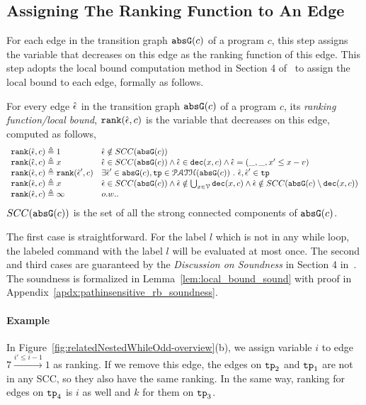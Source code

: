   \subsection{Assigning The Ranking Function to An Edge}
  For each edge in the transition graph $\mathtt{abs}{\mathtt{G}}(c)$ of a program $c$,
  this step assigns the variable that decreases on this edge as the ranking function of this edge.
  This step adopts the local bound computation method in Section 4 of~\cite{SinnZV17} to assign the local bound to each edge,
  formally as follows.
  \begin{defn}
  \label{def:ranking_gen}
  For every edge $\hat{\mathtt{\epsilon}{}}$ in the transition graph $\mathtt{abs}{\mathtt{G}}(c)$ of a program $c$,
  its \emph{ranking function/local bound}, $\mathtt{rank}(\hat{\mathtt{\epsilon}{}}, c)$
  is the variable that decreases on this edge, computed as follows,
  \[ 
\begin{array}{ll}
  \mathtt{rank}(\hat{\mathtt{\epsilon}{}}, c) \triangleq 1 
  & \hat{\mathtt{\epsilon}{}} \notin SCC(\mathtt{abs}{\mathtt{G}}(c))
  \\
  \mathtt{rank}(\hat{\mathtt{\epsilon}{}}, c) \triangleq x
  & \hat{\mathtt{\epsilon}{}} \in SCC(\mathtt{abs}{\mathtt{G}}(c)) \land \hat{\mathtt{\epsilon}{}} \in \mathtt{dec}(x, c) \land  \hat{\mathtt{\epsilon}{}} = (\_, \_ , x' \leq x - v) \\
  \mathtt{rank}(\hat{\mathtt{\epsilon}{}}, c) \triangleq \mathtt{rank}(\hat{\mathtt{\epsilon}{}}', c)
  & \exists \hat{\mathtt{\epsilon}{}}' \in \mathtt{abs}{\mathtt{G}}(c), \mathtt{tp} \in \mathcal{PATH}( \mathtt{abs}{\mathtt{G}}(c)) ~.~ \hat{\mathtt{\epsilon}{}}, \hat{\mathtt{\epsilon}{}}' \in \mathtt{tp} \\
  \mathtt{rank}(\hat{\mathtt{\epsilon}{}}, c) \triangleq x
  & \hat{\mathtt{\epsilon}{}} \in SCC(\mathtt{abs}{\mathtt{G}}(c)) \land 
  \hat{\mathtt{\epsilon}{}}  \notin \bigcup_{x \in \mathcal{V}} \mathtt{dec}(x, c)
  \land \hat{\mathtt{\epsilon}{}} \notin SCC(\mathtt{abs}{\mathtt{G}}(c) \setminus \mathtt{dec}(x, c))\\
  \mathtt{rank}(\hat{\mathtt{\epsilon}{}}, c) \triangleq \infty
  & o.w..
\end{array}
\]
  $SCC(\mathtt{abs}{\mathtt{G}}(c))$ is the set of all the strong connected components of $\mathtt{abs}{\mathtt{G}}(c)$.
  \end{defn}
    The first case is straightforward. 
    For the label $l$ which is not in any while loop, 
    the labeled command with the label $l$ will be 
    evaluated at most once. 
    The second and third cases are guaranteed by the \emph{Discussion on Soundness} in Section 4 in~\cite{SinnZV17}.
    The soundness is formalized in Lemma~\ref{lem:local_bound_sound} with proof in Appendix~\ref{apdx:pathinsensitive_rb_soundness}.
  \paragraph{Example}
  In Figure~\ref{fig:relatedNestedWhileOdd-overview}(b), we assign variable $i$ to edge $7 \xrightarrow{i' \leq i - 1} 1$ as ranking.
  If we remove this edge, the edges on $\mathtt{tp}_2$ and $\mathtt{tp}_1$ are not in any SCC, so they also have the same ranking.
In the same way, ranking for edges on $\mathtt{tp}_4$ is $i$ as well and $k$ for them on $\mathtt{tp}_3$.


